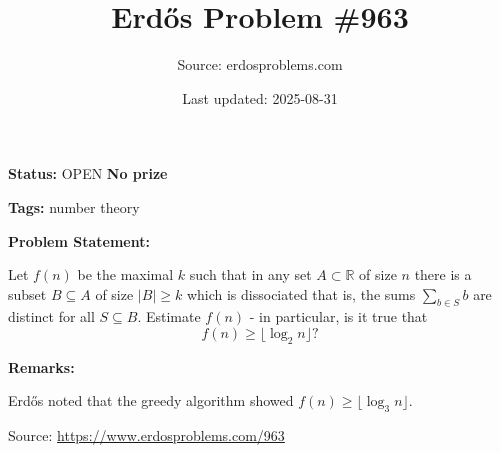 \documentclass{article}
\title{Erd\H{o}s Problem \#963}
\date{Last updated: 2025-08-31}
\author{Source: erdosproblems.com}
\begin{document}
\maketitle

\noindent\textbf{Status:} OPEN \quad \textbf{No prize}

\noindent\textbf{Tags:} number theory

\medskip
\noindent\textbf{Problem Statement:}

Let $f(n)$ be the maximal $k$ such that in any set $A\subset \mathbb{R}$ of size $n$ there is a subset $B\subseteq A$ of size $\lvert B\rvert\geq k$ which is dissociated that is, the sums $\sum_{b\in S}b$ are distinct for all $S\subseteq B$. Estimate $f(n)$ - in particular, is it true that\[f(n)\geq \lfloor \log_2 n\rfloor?\]

\bigskip
\noindent\textbf{Remarks:}

Erd\H{o}s noted that the greedy algorithm showed $f(n)\geq \lfloor \log_3 n\rfloor$.

\bigskip
\noindent\small{Source: \url{https://www.erdosproblems.com/963}}
\end{document}
